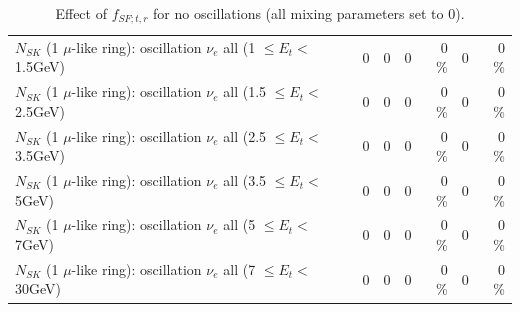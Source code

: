 \begin{table}
\begin{tabular}{| l | r | r | r  r | r  r |}
$N_{SK}$ (1 $\mu$-like ring): oscillation $\nu_{e}$ all (1 $\leq E_{t} <$ 1.5GeV) &               0 &               0 &               0 &        0 \%  &               0 &        0 \%  \\ 
$N_{SK}$ (1 $\mu$-like ring): oscillation $\nu_{e}$ all (1.5 $\leq E_{t} <$ 2.5GeV) &               0 &               0 &               0 &        0 \%  &               0 &        0 \%  \\ 
$N_{SK}$ (1 $\mu$-like ring): oscillation $\nu_{e}$ all (2.5 $\leq E_{t} <$ 3.5GeV) &               0 &               0 &               0 &        0 \%  &               0 &        0 \%  \\ 
$N_{SK}$ (1 $\mu$-like ring): oscillation $\nu_{e}$ all (3.5 $\leq E_{t} <$ 5GeV) &               0 &               0 &               0 &        0 \%  &               0 &        0 \%  \\ 
 $N_{SK}$ (1 $\mu$-like ring): oscillation $\nu_{e}$ all (5 $\leq E_{t} <$ 7GeV) &               0 &               0 &               0 &        0 \%  &               0 &        0 \%  \\ 
$N_{SK}$ (1 $\mu$-like ring): oscillation $\nu_{e}$ all (7 $\leq E_{t} <$ 30GeV) &               0 &               0 &               0 &        0 \%  &               0 &        0 \%  \\ 
\hline
\hline
\end{tabular}
\caption{ Effect of $f_{SF; t, r}$ for no oscillations (all mixing parameters set to 0). }
\label{tab:num_xsec_sf_1RmuT_3f_osc_t13:0}
\end{table}
\clearpage
